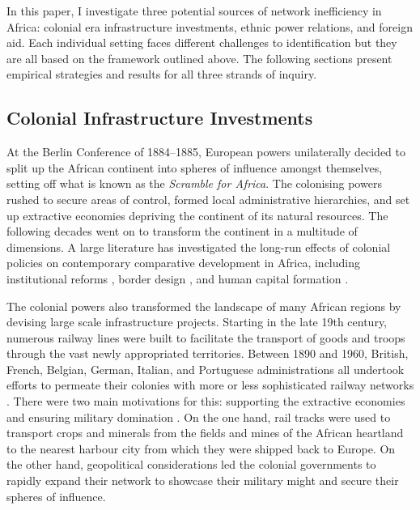 \documentclass[11pt, oneside]{article}   	%
\begin{document}
In this paper, I investigate three potential sources of network inefficiency in Africa: colonial era infrastructure investments, ethnic power relations, and foreign aid. Each individual setting faces different challenges to identification but they are all based on the framework outlined above. The following sections present empirical strategies and results for all three strands of inquiry.

\subsection{Colonial Infrastructure Investments}
At the Berlin Conference of 1884--1885, European powers unilaterally decided to split up the African continent into spheres of influence amongst themselves, setting off what is known as the \emph{Scramble for Africa}. The colonising powers rushed to secure areas of control, formed local administrative hierarchies, and set up extractive economies depriving the continent of its natural resources. The following decades went on to transform the continent in a multitude of dimensions. A large literature has investigated the long-run effects of colonial policies on contemporary comparative development in Africa, including institutional reforms \citep{Acemoglu_ColonialOriginsComparative_2001,Acemoglu_ReversalFortuneGeography_2002}, border design \citep{Michalopoulos_LongRunEffectsScramble_2016}, and human capital formation \citep{Wantchekon_EducationHumanCapital_2015}.

The colonial powers also transformed the landscape of many African regions by devising large scale infrastructure projects. Starting in the late 19th century, numerous railway lines were built to facilitate the transport of goods and troops through the vast newly appropriated territories. Between 1890 and 1960, British, French, Belgian, German, Italian, and Portuguese administrations all undertook efforts to permeate their colonies with more or less sophisticated railway networks \citep{Jedwab_PermanentEffectsTransportation_2016a}. There were two main motivations for this: supporting the extractive economies and ensuring military domination \citep{Jedwab_HistoryPathDependence_2017a}. On the one hand, rail tracks were used to transport crops and minerals from the fields and mines of the African heartland to the nearest harbour city from which they were shipped back to Europe. On the other hand, geopolitical considerations led the colonial governments to rapidly expand their network to showcase their military might and secure their spheres of influence.
\end{document}
